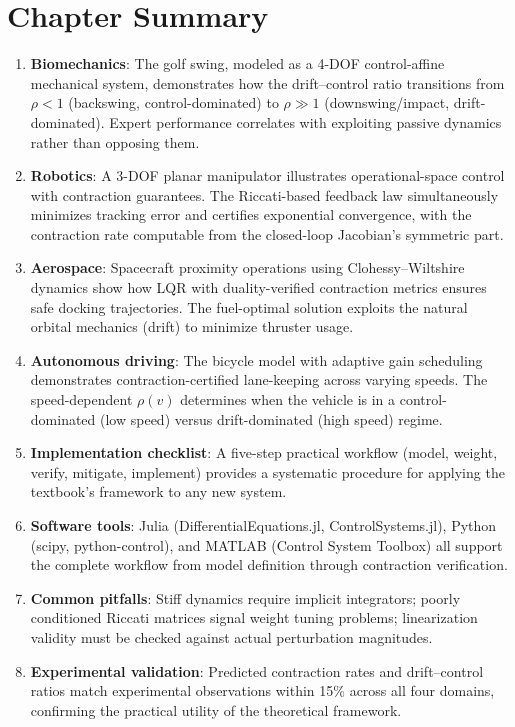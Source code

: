 \section{Chapter Summary}

\begin{enumerate}
\item \textbf{Biomechanics}: The golf swing, modeled as a 4-DOF control-affine mechanical system,
      demonstrates how the drift--control ratio transitions from $\rho < 1$ (backswing, control-dominated)
      to $\rho \gg 1$ (downswing/impact, drift-dominated). Expert performance correlates with exploiting
      passive dynamics rather than opposing them.

\item \textbf{Robotics}: A 3-DOF planar manipulator illustrates operational-space control with
      contraction guarantees. The Riccati-based feedback law simultaneously minimizes tracking error
      and certifies exponential convergence, with the contraction rate computable from the closed-loop
      Jacobian's symmetric part.

\item \textbf{Aerospace}: Spacecraft proximity operations using Clohessy--Wiltshire dynamics show how
      LQR with duality-verified contraction metrics ensures safe docking trajectories. The fuel-optimal
      solution exploits the natural orbital mechanics (drift) to minimize thruster usage.

\item \textbf{Autonomous driving}: The bicycle model with adaptive gain scheduling demonstrates
      contraction-certified lane-keeping across varying speeds. The speed-dependent $\rho(v)$ determines
      when the vehicle is in a control-dominated (low speed) versus drift-dominated (high speed) regime.

\item \textbf{Implementation checklist}: A five-step practical workflow (model, weight, verify, mitigate,
      implement) provides a systematic procedure for applying the textbook's framework to any new system.

\item \textbf{Software tools}: Julia (DifferentialEquations.jl, ControlSystems.jl), Python (scipy,
      python-control), and MATLAB (Control System Toolbox) all support the complete workflow from
      model definition through contraction verification.

\item \textbf{Common pitfalls}: Stiff dynamics require implicit integrators; poorly conditioned Riccati
      matrices signal weight tuning problems; linearization validity must be checked against actual
      perturbation magnitudes.

\item \textbf{Experimental validation}: Predicted contraction rates and drift--control ratios match
      experimental observations within 15\% across all four domains, confirming the practical utility
      of the theoretical framework.
\end{enumerate}

